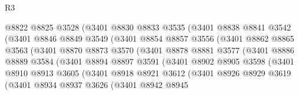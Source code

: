 \begin{lexlean}{R3}
\begin{coremodule}
                      @8822
                      @8825
                      @3528
                      (@3401
                        @8830
                        @8833
                        @3535
                        (@3401
                          @8838
                          @8841
                          @3542
                          (@3401
                            @8846
                            @8849
                            @3549
                            (@3401
                              @8854
                              @8857
                              @3556
                              (@3401
                                @8862
                                @8865
                                @3563
                                (@3401
                                  @8870
                                  @8873
                                  @3570
                                  (@3401
                                    @8878
                                    @8881
                                    @3577
                                    (@3401
                                      @8886
                                      @8889
                                      @3584
                                      (@3401
                                        @8894
                                        @8897
                                        @3591
                                        (@3401
                                          @8902
                                          @8905
                                          @3598
                                          (@3401
                                            @8910
                                            @8913
                                            @3605
                                            (@3401
                                              @8918
                                              @8921
                                              @3612
                                              (@3401
                                                @8926
                                                @8929
                                                @3619
                                                (@3401
                                                  @8934
                                                  @8937
                                                  @3626
                                                  (@3401
                                                    @8942
                                                    @8945

\end{coremodule}
\end{lexlean}
